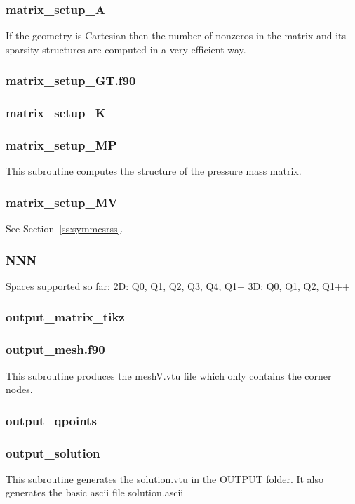  \subsubsection{matrix\_setup\_A}
 If the geometry is Cartesian then the number of nonzeros in the matrix and its sparsity 
 structures are computed in a very efficient way. 
 \subsubsection{matrix\_setup\_GT.f90}

 \subsubsection{matrix\_setup\_K}

 \subsubsection{matrix\_setup\_MP}
 This subroutine computes the structure of the pressure mass matrix. 
 \subsubsection{matrix\_setup\_MV}
 See Section~\ref{ss:symmcsrss}. 
 \subsubsection{NNN}
 Spaces supported so far:
 2D: Q0, Q1, Q2, Q3, Q4, Q1+
 3D: Q0, Q1, Q2, Q1++
 \subsubsection{output\_matrix\_tikz}

 \subsubsection{output\_mesh.f90}
 This subroutine produces the {\filenamefont meshV.vtu} file which only 
 contains the corner nodes.
 \subsubsection{output\_qpoints}

 \subsubsection{output\_solution}
 This subroutine generates the {\filenamefont solution.vtu} in the {\foldernamefont OUTPUT}
 folder. It also generates the basic ascii file {\filenamefont solution.ascii}
